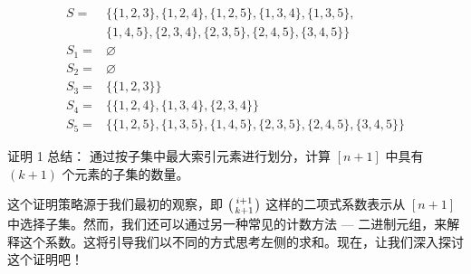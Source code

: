 \begin{align*}
    S =   & \Big\{\{1, 2, 3\}, \{1, 2, 4\}, \{1, 2, 5\}, \{1, 3, 4\}, \{1, 3, 5\},                    \\
          & \{1, 4, 5\}, \{2, 3, 4\}, \{2, 3, 5\}, \{2, 4, 5\}, \{3, 4, 5\}\Big\}                     \\
    S_1 = & \varnothing                                                                               \\
    S_2 = & \varnothing                                                                               \\
    S_3 = & \Big\{\{1, 2, 3\} \Big\}                                                                  \\
    S_4 = & \Big\{\{1, 2, 4\}, \{1, 3, 4\}, \{2, 3, 4\} \Big\}                                        \\
    S_5 = & \Big\{\{1, 2, 5\}, \{1, 3, 5\}, \{1, 4, 5\}, \{2, 3, 5\}, \{2, 4, 5\}, \{3, 4, 5\} \Big\}
\end{align*}

\begin{questions}{证明 1 总结：}
    通过按子集中最大索引元素进行划分，计算 $[n+1]$ 中具有 $(k+1)$ 个元素的子集的数量。
\end{questions}

这个证明策略源于我们最初的观察，即 $\big({i+1 \atop k+1}\big)$ 这样的二项式系数表示从 $[n + 1]$ 中选择子集。然而，我们还可以通过另一种常见的计数方法 --- 二进制元组，来解释这个系数。这将引导我们以不同的方式思考左侧的求和。现在，让我们深入探讨这个证明吧！

